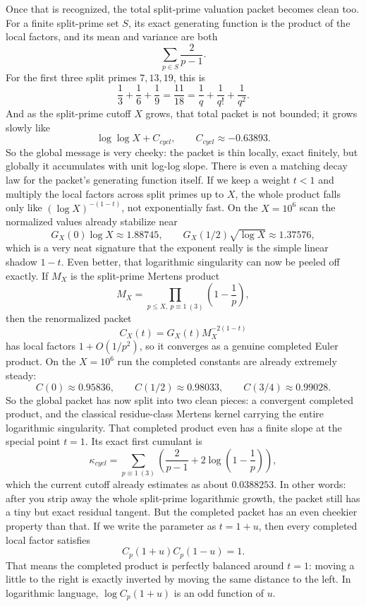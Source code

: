 \documentclass[11pt]{article}
\def\mathrm#1{#1}%
\def\mathcal#1{#1}%
\begin{document}
Once that is recognized, the total split-prime valuation packet becomes clean too. For a finite split-prime set $S$, its exact generating function is the product of the local factors, and its mean and variance are both
\[
\sum_{p\in S}\frac{2}{p-1}.
\]
For the first three split primes $7,13,19$, this is
\[
\frac13+\frac16+\frac19=\frac{11}{18}=\frac1q+\frac1{q!}+\frac1{q^2}.
\]
And as the split-prime cutoff $X$ grows, that total packet is not bounded; it grows slowly like
\[
\log\log X + C_{\mathrm{cycl}}, \qquad C_{\mathrm{cycl}}\approx -0.63893.
\]
So the global message is very cheeky: the packet is thin locally, exact finitely, but globally it accumulates with unit log-log slope.
There is even a matching decay law for the packet's generating function itself. If we keep a weight $t<1$ and multiply the local factors across split primes up to $X$, the whole product falls only like $(\log X)^{-(1-t)}$, not exponentially fast. On the $X=10^6$ scan the normalized values already stabilize near
\[
G_X(0)\log X\approx1.88745,\qquad G_X(1/2)\sqrt{\log X}\approx1.37576,
\]
which is a very neat signature that the exponent really is the simple linear shadow $1-t$.
Even better, that logarithmic singularity can now be peeled off exactly. If $M_X$ is the split-prime Mertens product
\[
M_X=\prod_{p\le X,\ p\equiv1\ (3)}\left(1-\frac1p\right),
\]
then the renormalized packet
\[
\mathcal C_X(t)=G_X(t)M_X^{-2(1-t)}
\]
has local factors $1+O(1/p^2)$, so it converges as a genuine completed Euler product. On the $X=10^6$ run the completed constants are already extremely steady:
\[
\mathcal C(0)\approx0.95836,\qquad \mathcal C(1/2)\approx0.98033,\qquad \mathcal C(3/4)\approx0.99028.
\]
So the global packet has now split into two clean pieces: a convergent completed product, and the classical residue-class Mertens kernel carrying the entire logarithmic singularity.
That completed product even has a finite slope at the special point $t=1$. Its exact first cumulant is
\[
\kappa_{\mathrm{cycl}}=\sum_{p\equiv1\ (3)}\left(\frac{2}{p-1}+2\log\left(1-\frac1p\right)\right),
\]
which the current cutoff already estimates as about $0.0388253$. In other words: after you strip away the whole split-prime logarithmic growth, the packet still has a tiny but exact residual tangent.
But the completed packet has an even cheekier property than that. If we write the parameter as $t=1+u$, then every completed local factor satisfies
\[
\mathcal C_p(1+u)\mathcal C_p(1-u)=1.
\]
That means the completed product is perfectly balanced around $t=1$: moving a little to the right is exactly inverted by moving the same distance to the left. In logarithmic language, $\log\mathcal C_p(1+u)$ is an odd function of $u$.
\end{document}
